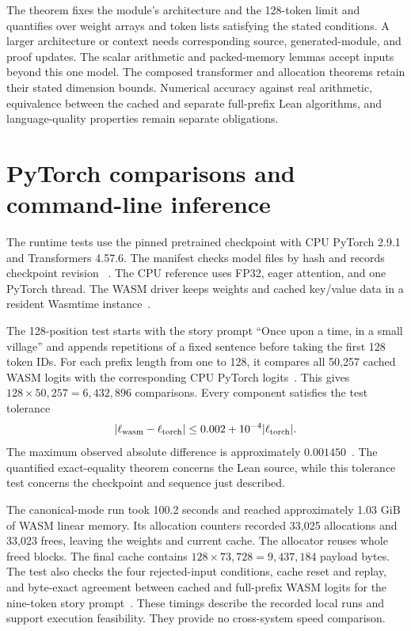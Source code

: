 \documentclass[11pt]{article}
\newcommand{\longcode}[1]{\texttt{\seqsplit{#1}}}
\begin{document}
The theorem fixes the module's architecture and the 128-token limit and quantifies over weight arrays and token lists satisfying the stated conditions.  A larger architecture or context needs corresponding source, generated-module, and proof updates.  The scalar arithmetic and packed-memory lemmas accept inputs beyond this one model.  The composed transformer and allocation theorems retain their stated dimension bounds.  Numerical accuracy against real arithmetic, equivalence between the cached and separate full-prefix Lean algorithms, and language-quality properties remain separate obligations.

\section{PyTorch comparisons and command-line inference}\label{sec:tests}

The runtime tests use the pinned pretrained checkpoint with CPU PyTorch 2.9.1 and Transformers 4.57.6.  The manifest checks model files by hash and records checkpoint revision \longcode{607a30d783dfa663caf39e06633721c8d4cfcd7e}~\cite{manifest}.  The CPU reference uses FP32, eager attention, and one PyTorch thread.  The WASM driver keeps weights and cached key/value data in a resident Wasmtime instance~\cite{driver}.

The 128-position test starts with the story prompt ``Once upon a time, in a small village'' and appends repetitions of a fixed sentence before taking the first 128 token IDs.  For each prefix length from one to 128, it compares all 50,257 cached WASM logits with the corresponding CPU PyTorch logits~\cite{testcode}.  This gives $128\times50{,}257=6{,}432{,}896$ comparisons.  Every component satisfies the test tolerance
\[
|\ell_{\rm wasm}-\ell_{\rm torch}|
\leq 0.002+10^{-4}|\ell_{\rm torch}|.
\]
The maximum observed absolute difference is approximately $0.001450$~\cite{tests}.  The quantified exact-equality theorem concerns the Lean source, while this tolerance test concerns the checkpoint and sequence just described.

The canonical-mode run took 100.2 seconds and reached approximately 1.03 GiB of WASM linear memory.  Its allocation counters recorded 33,025 allocations and 33,023 frees, leaving the weights and current cache.  The allocator reuses whole freed blocks.  The final cache contains $128\times73{,}728=9{,}437{,}184$ payload bytes.  The test also checks the four rejected-input conditions, cache reset and replay, and byte-exact agreement between cached and full-prefix WASM logits for the nine-token story prompt~\cite{tests,testcode}.  These timings describe the recorded local runs and support execution feasibility.  They provide no cross-system speed comparison.
\end{document}
